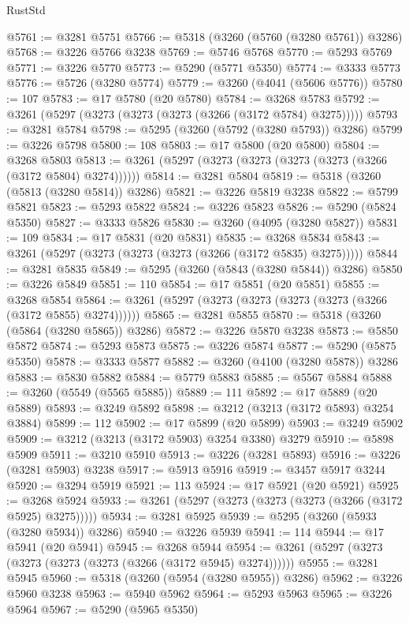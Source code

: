\begin{lexlean}{RustStd}
\begin{coremodule}
{\begin{coremodule}
{{{{{{{{{{{{{{{{{{{{{{{{{{@5761 := @3281 @5751
@5766 := @5318 (@3260 (@5760 (@3280 @5761)) @3286)
@5768 := @3226 @5766 @3238
@5769 := @5746 @5768
@5770 := @5293 @5769
@5771 := @3226 @5770
@5773 := @5290 (@5771 @5350)
@5774 := @3333 @5773
@5776 := @5726 (@3280 @5774)
@5779 := @3260 (@4041 (@5606 @5776))
@5780 := 107
@5783 := @17 @5780 (@20 @5780)
@5784 := @3268 @5783
@5792 := @3261 (@5297 (@3273 (@3273 (@3273 (@3266 (@3172 @5784) @3275)))))
@5793 := @3281 @5784
@5798 := @5295 (@3260 (@5792 (@3280 @5793)) @3286)
@5799 := @3226 @5798
@5800 := 108
@5803 := @17 @5800 (@20 @5800)
@5804 := @3268 @5803
@5813 := @3261 (@5297 (@3273 (@3273 (@3273 (@3273 (@3266 (@3172 @5804) @3274))))))
@5814 := @3281 @5804
@5819 := @5318 (@3260 (@5813 (@3280 @5814)) @3286)
@5821 := @3226 @5819 @3238
@5822 := @5799 @5821
@5823 := @5293 @5822
@5824 := @3226 @5823
@5826 := @5290 (@5824 @5350)
@5827 := @3333 @5826
@5830 := @3260 (@4095 (@3280 @5827))
@5831 := 109
@5834 := @17 @5831 (@20 @5831)
@5835 := @3268 @5834
@5843 := @3261 (@5297 (@3273 (@3273 (@3273 (@3266 (@3172 @5835) @3275)))))
@5844 := @3281 @5835
@5849 := @5295 (@3260 (@5843 (@3280 @5844)) @3286)
@5850 := @3226 @5849
@5851 := 110
@5854 := @17 @5851 (@20 @5851)
@5855 := @3268 @5854
@5864 := @3261 (@5297 (@3273 (@3273 (@3273 (@3273 (@3266 (@3172 @5855) @3274))))))
@5865 := @3281 @5855
@5870 := @5318 (@3260 (@5864 (@3280 @5865)) @3286)
@5872 := @3226 @5870 @3238
@5873 := @5850 @5872
@5874 := @5293 @5873
@5875 := @3226 @5874
@5877 := @5290 (@5875 @5350)
@5878 := @3333 @5877
@5882 := @3260 (@4100 (@3280 @5878)) @3286
@5883 := @5830 @5882
@5884 := @5779 @5883
@5885 := @5567 @5884
@5888 := @3260 (@5549 (@5565 @5885))
@5889 := 111
@5892 := @17 @5889 (@20 @5889)
@5893 := @3249 @5892
@5898 := @3212 (@3213 (@3172 @5893) @3254 @3884)
@5899 := 112
@5902 := @17 @5899 (@20 @5899)
@5903 := @3249 @5902
@5909 := @3212 (@3213 (@3172 @5903) @3254 @3380) @3279
@5910 := @5898 @5909
@5911 := @3210 @5910
@5913 := @3226 (@3281 @5893)
@5916 := @3226 (@3281 @5903) @3238
@5917 := @5913 @5916
@5919 := @3457 @5917 @3244
@5920 := @3294 @5919
@5921 := 113
@5924 := @17 @5921 (@20 @5921)
@5925 := @3268 @5924
@5933 := @3261 (@5297 (@3273 (@3273 (@3273 (@3266 (@3172 @5925) @3275)))))
@5934 := @3281 @5925
@5939 := @5295 (@3260 (@5933 (@3280 @5934)) @3286)
@5940 := @3226 @5939
@5941 := 114
@5944 := @17 @5941 (@20 @5941)
@5945 := @3268 @5944
@5954 := @3261 (@5297 (@3273 (@3273 (@3273 (@3273 (@3266 (@3172 @5945) @3274))))))
@5955 := @3281 @5945
@5960 := @5318 (@3260 (@5954 (@3280 @5955)) @3286)
@5962 := @3226 @5960 @3238
@5963 := @5940 @5962
@5964 := @5293 @5963
@5965 := @3226 @5964
@5967 := @5290 (@5965 @5350)
}}}}}}}}}}}}}}}}}}}}}}}}}}
\end{coremodule}}
\end{coremodule}
\end{lexlean}
